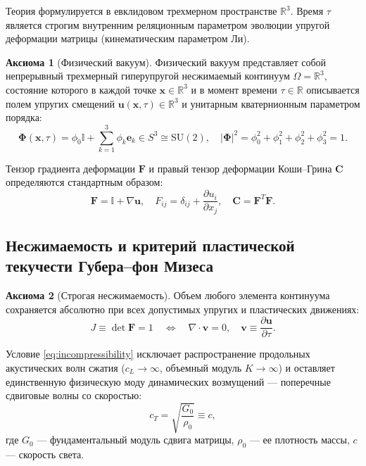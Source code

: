 \documentclass[11pt,a4paper,oneside]{article}
\theoremstyle{plain}
\theoremstyle{definition}
\newtheorem{axiom}{Аксиома}
\theoremstyle{remark}
\numberwithin{equation}{section}
\begin{document}
	Теория формулируется в евклидовом трехмерном пространстве $\mathbb{R}^3$. Время $\tau$ является строгим внутренним реляционным параметром эволюции упругой деформации матрицы (кинематическим параметром Ли).
	
	\begin{axiom}[Физический вакуум]
		Физический вакуум представляет собой непрерывный трехмерный гиперупругой несжимаемый континуум $\Omega = \mathbb{R}^3$, состояние которого в каждой точке $\mathbf{x} \in \mathbb{R}^3$ и в момент времени $\tau \in \mathbb{R}$ описывается полем упругих смещений $\mathbf{u}(\mathbf{x}, \tau) \in \mathbb{R}^3$ и унитарным кватернионным параметром порядка:
		\begin{equation}
			\boldsymbol{\Phi}(\mathbf{x}, \tau) = \phi_0 \mathbb{I} + \sum_{k=1}^3 \phi_k \mathbf{e}_k \in S^3 \cong \mathrm{SU}(2), \quad |\boldsymbol{\Phi}|^2 = \phi_0^2 + \phi_1^2 + \phi_2^2 + \phi_3^2 = 1.
		\end{equation}
	\end{axiom}
	
	Тензор градиента деформации $\mathbf{F}$ и правый тензор деформации Коши--Грина $\mathbf{C}$ определяются стандартным образом:
	\begin{equation}
		\mathbf{F} = \mathbb{I} + \nabla \mathbf{u}, \quad F_{ij} = \delta_{ij} + \frac{\partial u_i}{\partial x_j}, \quad \mathbf{C} = \mathbf{F}^T \mathbf{F}.
	\end{equation}
	
	\subsection{Несжимаемость и критерий пластической текучести Губера--фон Мизеса}
	
	\begin{axiom}[Строгая несжимаемость]
		Объем любого элемента континуума сохраняется абсолютно при всех допустимых упругих и пластических движениях:
		\begin{equation}
			J \equiv \det \mathbf{F} = 1 \quad \Longleftrightarrow \quad \nabla \cdot \mathbf{v} = 0, \quad \mathbf{v} \equiv \frac{\partial \mathbf{u}}{\partial \tau}.
			\label{eq:incompressibility}
		\end{equation}
	\end{axiom}
	
	Условие \eqref{eq:incompressibility} исключает распространение продольных акустических волн сжатия ($c_L \to \infty$, объемный модуль $K \to \infty$) и оставляет единственную физическую моду динамических возмущений — поперечные сдвиговые волны со скоростью:
	\begin{equation}
		c_T = \sqrt{\frac{G_0}{\rho_0}} \equiv c,
	\end{equation}
	где $G_0$ — фундаментальный модуль сдвига матрицы, $\rho_0$ — ее плотность массы, $c$ — скорость света.
	
\end{document}
